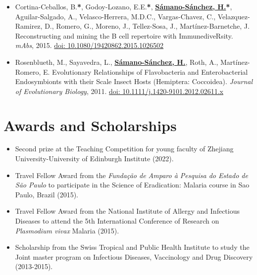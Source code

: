 \documentclass[11pt,a4paper,sans]{moderncv} %
\begin{document}
\begin{itemize}
  \item Cortina-Ceballos, B.\textbf{*}, Godoy-Lozano, E.E.\textbf{*}, \textbf{\underline{S\'amano-S\'anchez, H.}}\textbf{*}, Aguilar-Salgado, A., Velasco-Herrera, M.D.C., Vargas-Chavez, C., Velazquez-Ramirez, D., Romero, G., Moreno, J., Tellez-Sosa, J., Mart\'inez-Barnetche, J. Reconstructing and mining the B cell repertoire with ImmunediveRsity. \textit{mAbs}, 2015. \href{https://doi.org/10.1080/19420862.2015.1026502}{doi: 10.1080/19420862.2015.1026502}
  \item Rosenblueth, M., Sayavedra, L., \textbf{\underline{S\'amano-S\'anchez, H.}}, Roth, A., Mart\'inez-Romero, E. Evolutionary Relationships of Flavobacteria and Enterobacterial Endosymbionts with their Scale Insect Hosts (Hemiptera: Coccoidea). \textit{Journal of Evolutionary Biology}, 2011. \href{https://doi.org/10.1111/j.1420-9101.2012.02611.x}{doi: 10.1111/j.1420-9101.2012.02611.x}\\
\end{itemize}

\vspace{0.5cm}

\section{Awards and Scholarships}
\begin{itemize}
  \item Second prize at the Teaching Competition for young faculty of Zhejiang University-University of Edinburgh Institute (2022).
  \item Travel Fellow Award from the \textit{Funda\c c\~ao de Amparo \`a Pesquisa do Estado de S\~ao Paulo} to participate in the Science of Eradication: Malaria course in Sao Paulo, Brazil (2015).
  \item Travel Fellow Award from the National Institute of Allergy and Infectious Diseases to attend the 5th International Conference of Research on \textit{Plasmodium vivax} Malaria (2015).
  \item Scholarship from the Swiss Tropical and Public Health Institute to study the Joint master program on Infectious Diseases, Vaccinology and Drug Discovery (2013-2015).\\
\end{itemize}
\end{document}

